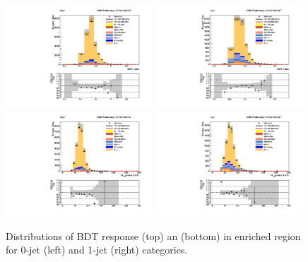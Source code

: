 \begin{figure}[!htpb]\centering
 \includegraphics[width=0.49\textwidth]{plots_and_figures/chapter6/ztt_cr/0_preselection_BDT_value.pdf}
 \includegraphics[width=0.49\textwidth]{plots_and_figures/chapter6/ztt_cr/1_preselection_BDT_value.pdf} \\
 \includegraphics[width=0.49\textwidth]{plots_and_figures/chapter6/ztt_cr/0_preselection_h_collmass_pfmet.pdf} 
 \includegraphics[width=0.49\textwidth]{plots_and_figures/chapter6/ztt_cr/1_preselection_h_collmass_pfmet.pdf} \\

 \caption{Distributions of BDT response (top) an \mcol (bottom) in \ztt enriched region for 0-jet (left)  and 1-jet (right) categories.}
 \label{fig:ztt_cr}
\end{figure}


